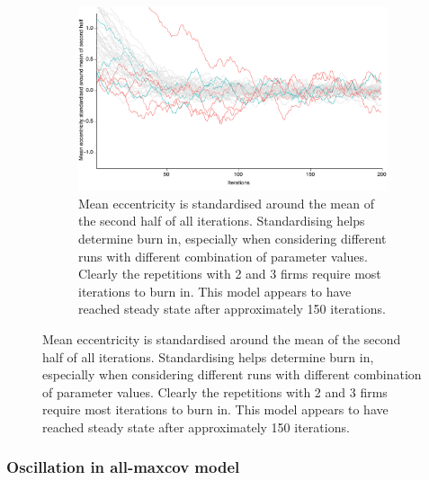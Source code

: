 \documentclass[preprint, 12pt]{elsarticle}
\begin{document}
\begin{figure}[htp!]
	\begin{subfigure}[t]{0.83\textwidth}
		\includegraphics[width=\textwidth]{Graphics/figb23b.pdf}
		\caption{Mean eccentricity is standardised around the mean of the second half of all iterations. Standardising helps determine burn in, especially when considering different runs with different combination of parameter values. Clearly the repetitions with 2 and 3 firms require most iterations to burn in. This model appears to have reached steady state after approximately 150 iterations.}
		\label{fig:multirepstd}
	\end{subfigure}
	\label{fig:filtertime}
\end{figure}


\subsubsection{Oscillation in all-maxcov model}
\label{sec:oscmaxcov}
\end{document}

